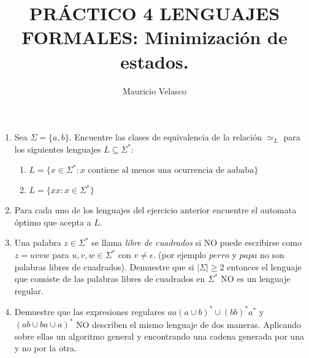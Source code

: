 \documentclass[12pt, a4paper]{article}
\date{}
\begin{document}
\title{PRÁCTICO 4 LENGUAJES FORMALES: Minimización de estados.}
\author{Mauricio Velasco}
\maketitle{}

\begin{enumerate} 
\item Sea $\Sigma =\{a,b\}$. Encuentre las clases de equivalencia de la relación $\simeq_L$ para los siguientes lenguajes $L\subseteq \Sigma^*$:
\begin{enumerate}
\item $L=\{x\in \Sigma^*: x\text{ contiene al menos una ocurrencia de aababa}\}$
\item $L=\{xx:x\in \Sigma^*\}$
\end{enumerate}
\item Para cada uno de los lenguajes del ejercicio anterior encuentre el automata óptimo que acepta a $L$.

\item Una palabra $z\in \Sigma^*$ se llama \emph{libre de cuadrados} si NO puede escribirse como $z=uvvw$ para $u,v,w\in \Sigma^*$ con $v\neq \epsilon$. (por ejemplo $perro$ y $papa$ no son palabras libres de cuadrados). Demuestre que si $|\Sigma|\geq 2$ entonces el lenguaje que consiste de las palabras libres de cuadrados en $\Sigma^*$ NO es un lenguaje regular.

\item Demuestre que las expresiones regulares $aa(a\cup b)^*\cup (bb)^*a^*$ y $(ab\cup ba\cup a)^*$ NO describen el mismo lenguaje de dos maneras. Aplicando sobre ellas un algoritmo general y encontrando una cadena generada por una y no por la otra.


 
\end{enumerate}
\end{document}

